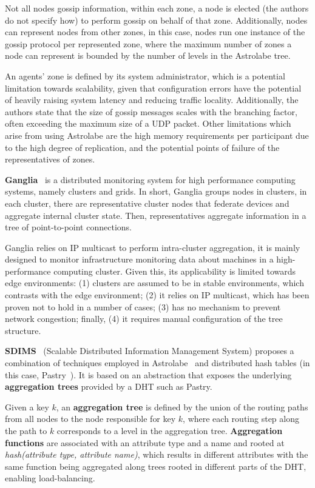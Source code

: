 Not all nodes gossip information, within each zone, a node is elected (the authors do not specify how) to perform gossip on behalf of that zone. Additionally, nodes can represent nodes from other zones, in this case, nodes run one instance of the gossip protocol per represented zone, where the maximum number of zones a node can represent is bounded by the number of levels in the Astrolabe tree.

An agents' zone is defined by its system administrator, which is a potential limitation towards scalability, given that configuration errors have the potential of heavily raising system latency and reducing traffic locality. Additionally, the authors state that the size of gossip messages scales with the branching factor, often exceeding the maximum size of a UDP packet. Other limitations which arise from using Astrolabe are the high memory requirements per participant due to the high degree of replication, and the potential points of failure of the representatives of zones.

\textbf{Ganglia}~\cite{massie2004ganglia} is a distributed monitoring system for high performance computing systems, namely clusters and grids. In short, Ganglia groups nodes in clusters, in each cluster, there are representative cluster nodes that federate devices and aggregate internal cluster state. Then, representatives aggregate information in a tree of point-to-point connections.

Ganglia relies on IP multicast to perform intra-cluster aggregation, it is mainly designed to monitor infrastructure monitoring data about machines in a high-performance computing cluster. Given this, its applicability is limited towards edge environments: (1) clusters are assumed to be in stable environments, which contrasts with the edge environment; (2) it relies on IP multicast, which has been proven not to hold in a number of cases; (3) has no mechanism to prevent network congestion; finally, (4) it requires manual configuration of the tree structure.

\textbf{SDIMS}~\cite{SDIMS} (Scalable Distributed Information Management System) proposes a combination of techniques employed in Astrolabe~\cite{Renesse2003} and distributed hash tables (in this case, Pastry~\cite{rowstron2001pastry}). It is based on an abstraction that exposes the underlying \textbf{aggregation trees} provided by a DHT such as Pastry. 

Given a key $k$, an \textbf{aggregation tree} is defined by the union of the routing paths from all nodes to the node responsible for key $k$, where each routing step along the path to $k$ corresponds to a level in the aggregation tree. \textbf{Aggregation functions} are associated with an attribute type and a name and rooted at \textit{hash(attribute type, attribute name)}, which results in different attributes with the same function being aggregated along trees rooted in different parts of the DHT, enabling load-balancing.


